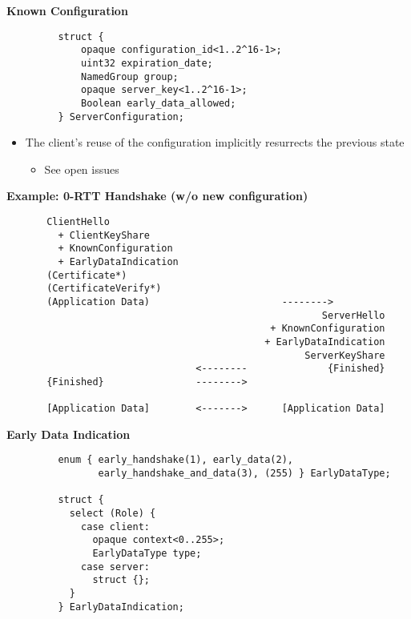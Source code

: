 \documentclass[helvetica]{seminar}
\newcommand{\heading}[1]{%
  \begin{center} 
    \large\bf 
    #1 
  \end{center} 
  \vspace{.4 in}}
\begin{document}
\begin{slide}
\heading{Known Configuration}

\begin{footnotesize}
\begin{verbatim}
         struct {
             opaque configuration_id<1..2^16-1>;
             uint32 expiration_date;
             NamedGroup group;
             opaque server_key<1..2^16-1>;
             Boolean early_data_allowed;
         } ServerConfiguration;
\end{verbatim}
\end{footnotesize}

\begin{itemize}
\item The client's reuse of the configuration implicitly resurrects the previous state
  \begin{itemize}
  \item See open issues
  \end{itemize}
\end{itemize}

\end{slide}



\begin{slide}
\heading{Example: 0-RTT Handshake (w/o new configuration)}

\vspace{-4ex}
\begin{footnotesize}
\begin{verbatim}
       ClientHello
         + ClientKeyShare
         + KnownConfiguration
         + EarlyDataIndication
       (Certificate*)
       (CertificateVerify*)
       (Application Data)                       -------->
                                                       ServerHello
                                              + KnownConfiguration
                                             + EarlyDataIndication
                                                    ServerKeyShare
                                 <--------              {Finished}
       {Finished}                -------->

       [Application Data]        <------->      [Application Data]
\end{verbatim}
\end{footnotesize}
\end{slide}


\begin{slide}
\heading{Early Data Indication}


\begin{footnotesize}
\begin{verbatim}
         enum { early_handshake(1), early_data(2),
                early_handshake_and_data(3), (255) } EarlyDataType;

         struct {
           select (Role) {
             case client:
               opaque context<0..255>;
               EarlyDataType type;
             case server:
               struct {};
           }
         } EarlyDataIndication;
\end{verbatim}
\end{footnotesize}
\end{slide}
\end{document}
